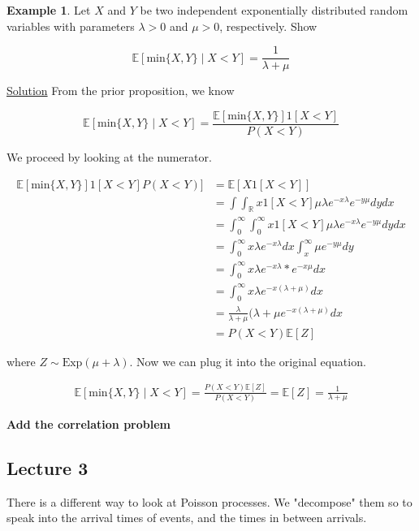 \documentclass[12pt]{article}
\theoremstyle{definition}
\newtheorem{example}{Example}[section]
\begin{document}
\begin{example}
  Let $X$ and $Y$ be two independent exponentially distributed random variables with parameters $\lambda > 0$ and $\mu > 0$, respectively. Show

  $$
  \mathbb{E}[\text{min}\{X, Y\} \mid X<Y] = \frac{1}{\lambda + \mu}
  $$

  \underline{Solution}
  From the prior proposition, we know

  $$
  \mathbb{E}[\text{min}\{X,Y\} \mid X<Y] = \frac{\mathbb{E}[\text{min}\{X,Y\}] 1[X<Y]}{P(X < Y)}
  $$

  We proceed by looking at the numerator.

  \begin{align*}
    \mathbb{E}[\text{min}\{X,Y\}] 1[X<Y]P(X < Y)] &= \mathbb{E}[X 1[X < Y]] \\
    &= \int \int_{\mathbb{R}} x 1[X < Y] \mu \lambda e^{-x\lambda}e^{-y \mu} dy dx \\
    &= \int_0^\infty \int_0^\infty x 1[X <Y] \mu \lambda e^{-x\lambda}e^{-y \mu} dy dx \\
    &= \int_0^\infty x \lambda e^{-x\lambda} dx \int_x^\infty \mu e^{-y \mu} dy \\
    &= \int_0^\infty x \lambda e^{-x \lambda} * e^{-x\mu}dx \\
    &=  \int_0^\infty x \lambda e^{-x(\lambda + \mu)} dx \\
    &= \frac{\lambda}{\lambda + \mu} (\lambda + \mu e^{-x(\lambda + \mu)} dx \\
    &= P(X < Y) \mathbb{E}[Z]
  \end{align*}

  where $Z \sim \text{Exp}(\mu + \lambda)$. Now we can plug it into the original equation.

  \begin{align*}
    \mathbb{E}[\text{min}\{X,Y\} \mid X<Y] = \frac{P(X < Y) \mathbb{E}[Z]}{P(X<Y)} = \mathbb{E}[Z] = \frac{1}{\lambda + \mu}
  \end{align*}
\end{example}

\textbf{Add the correlation problem}

\subsection{Lecture 3}

There is a different way to look at Poisson processes. We "decompose" them so to speak into the arrival times of events, and the times in between arrivals.
\end{document}
